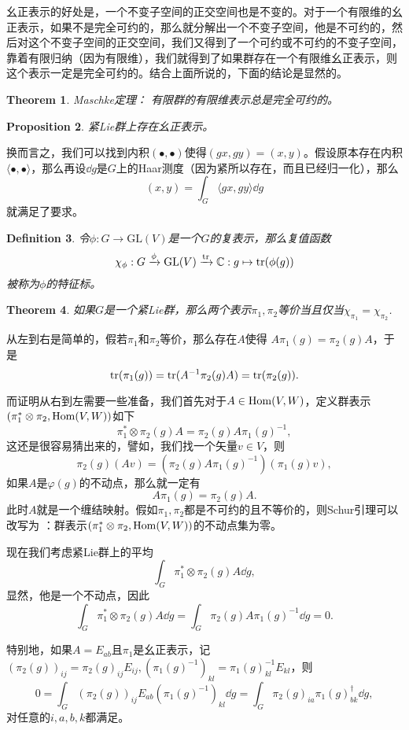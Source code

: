 \documentclass[8pt]{book}
\theoremstyle{plain}
\newtheorem{defi}{Definition}
\newtheorem{pro}[defi]{Proposition}
\newtheorem{theo}[defi]{Theorem}
\newcommand{\cc}{\mathbb{C}}
\begin{document}
幺正表示的好处是，一个不变子空间的正交空间也是不变的。对于一个有限维的幺正表示，如果不是完全可约的，那么就分解出一个不变子空间，他是不可约的，然后对这个不变子空间的正交空间，我们又得到了一个可约或不可约的不变子空间，靠着有限归纳（因为有限维），我们就得到了如果群存在一个有限维幺正表示，则这个表示一定是完全可约的。结合上面所说的，下面的结论是显然的。
\begin{theo}Maschke定理：
有限群的有限维表示总是完全可约的。 
\end{theo}

\begin{pro}
紧Lie群上存在幺正表示。
\end{pro}
换而言之，我们可以找到内积$(\bullet,\bullet)$使得$(gx,gy)=(x,y)$。假设原本存在内积$\langle \bullet,\bullet \rangle$，那么再设$\dd g$是$G$上的Haar测度（因为紧所以存在，而且已经归一化），那么
\[
	(x,y)=\int_G \langle gx,gy \rangle \dd g
\]
就满足了要求。

\begin{defi}
	令$\phi:G\to \mathrm{GL}(V)$是一个$G$的复表示，那么复值函数
	\[
	\chi_\phi:G\xrightarrow{\phi}\mathrm{GL}(V)\xrightarrow{\tr}\cc:g\mapsto \tr(\phi(g))
	\]
	被称为$\phi$的特征标。
\end{defi}
\begin{theo}
如果$G$是一个紧Lie群，那么两个表示$\pi_1,\pi_2$等价当且仅当$\chi_{\pi_1}=\chi_{\pi_2}$.
\end{theo}
从左到右是简单的，假若$\pi_1$和$\pi_2$等价，那么存在$A$使得
$A\pi_1(g)=\pi_2(g)A$，于是
\[
	\operatorname{tr}(\pi_1(g))=\operatorname{tr}(A^{-1}\pi_2(g)A)=\operatorname{tr}(\pi_2(g)).
\]

而证明从右到左需要一些准备，我们首先对于$A\in \operatorname{Hom}(V,W)$，定义群表示$(\pi_1^*\otimes\pi_2,\operatorname{Hom}(V,W))$如下
\[
	\pi_1^*\otimes\pi_2(g)A=\pi_2(g)A\pi_1(g)^{-1},
\]
这还是很容易猜出来的，譬如，我们找一个矢量$v\in V$，则
\[
	\pi_2(g)(Av)=(\pi_2(g)A\pi_1(g)^{-1})(\pi_1(g)v),
\]
如果$A$是$\varphi(g)$的不动点，那么就一定有
\[
	A\pi_1(g)=\pi_2(g)A.
\]
此时$A$就是一个缠结映射。假如$\pi_1,\pi_2$都是不可约的且不等价的，则Schur引理可以改写为  ：群表示$(\pi_1^*\otimes\pi_2,\operatorname{Hom}(V,W))$的不动点集为零。

现在我们考虑紧Lie群上的平均
\[
	\int_G \pi_1^*\otimes\pi_2(g)A \dd g,
\]
显然，他是一个不动点，因此
\[
	\int_G \pi_1^*\otimes\pi_2(g)A \dd g=\int_G \pi_2(g)A\pi_1(g)^{-1}\dd g=0.
\]

特别地，如果$A=E_{ab}$且$\pi_1$是幺正表示，记$(\pi_2(g))_{ij}=\pi_2(g)_{ij}E_{ij},\left(\pi_1(g)^{-1}\right)_{kl}=\pi_1(g)^{-1}_{kl}E_{kl}$，则
\[
0=\int_G (\pi_2(g))_{ij}E_{ab}\left(\pi_1(g)^{-1}\right)_{kl}\dd g=\int_G \pi_2(g)_{ia}\pi_1(g)^{\dag}_{bk}\dd g,
\]
对任意的$i,a,b,k$都满足。
\end{document}
